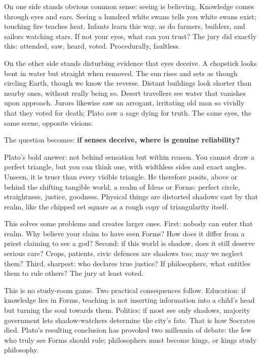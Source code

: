 On one side stands obvious common sense: seeing is believing. Knowledge comes through eyes and ears. Seeing a hundred white swans tells you white swans exist; touching fire teaches heat. Infants learn this way, as do farmers, builders, and sailors watching stars. If not your eyes, what can you trust? The jury did exactly this: attended, saw, heard, voted. Procedurally, faultless.

On the other side stands disturbing evidence that eyes deceive. A chopstick looks bent in water but straight when removed. The sun rises and sets as though circling Earth, though we know the reverse. Distant buildings look shorter than nearby ones, without really being so. Desert travellers see water that vanishes upon approach. Jurors likewise saw an arrogant, irritating old man so vividly that they voted for death; Plato saw a sage dying for truth. The same eyes, the same scene, opposite visions.

The question becomes: \textbf{if senses deceive, where is genuine reliability?}

Plato's bold answer: not behind sensation but within reason. You cannot draw a perfect triangle, but you can think one, with widthless sides and exact angles. Unseen, it is truer than every visible triangle. He therefore posits, above or behind the shifting tangible world, a realm of Ideas or Forms: perfect circle, straightness, justice, goodness. Physical things are distorted shadows cast by that realm, like the chipped set square as a rough copy of triangularity itself.

This solves some problems and creates larger ones. First: nobody can enter that realm. Why believe your claim to have seen Forms? How does it differ from a priest claiming to see a god? Second: if this world is shadow, does it still deserve serious care? Crops, patients, civic defences are shadows too; may we neglect them? Third, sharpest: who declares true justice? If philosophers, what entitles them to rule others? The jury at least voted.

This is no study-room game. Two practical consequences follow. Education: if knowledge lies in Forms, teaching is not inserting information into a child's head but turning the soul towards them. Politics: if most see only shadows, majority government lets shadow-watchers determine the city's fate. That is how Socrates died. Plato's resulting conclusion has provoked two millennia of debate: the few who truly see Forms should rule; philosophers must become kings, or kings study philosophy.

